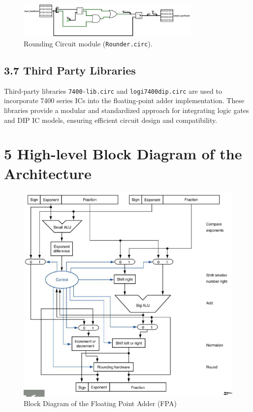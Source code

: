\documentclass{article}
\begin{document}
\begin{figure}[h!]
\centering
\includegraphics[width=0.8\textwidth]{Rounding.jpg} %
\caption{Rounding Circuit module (\texttt{Rounder.circ}).}
\label{fig:rounding_circuit}
\end{figure}
\pagebreak
\subsection*{3.7 Third Party Libraries}
Third-party libraries \texttt{7400-lib.circ} and \texttt{logi7400dip.circ} are used to incorporate 7400 series ICs into the floating-point adder implementation. These libraries provide a modular and standardized approach for integrating logic gates and DIP IC models, ensuring efficient circuit design and compatibility.
\section*{5  High-level Block Diagram of the Architecture }
\begin{figure}[h!]
\centering
\includegraphics[width=\textwidth]{Block.jpg} 
\caption{Block Diagram of the Floating Point Adder (FPA)}
\label{fig:fpa_block_diagram}
\end{figure}
\end{document}
